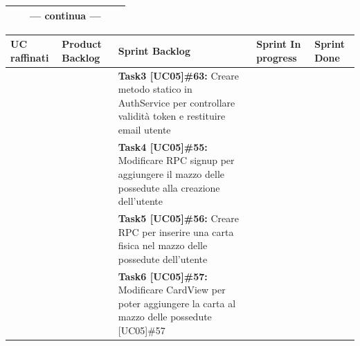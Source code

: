 \begin{landscape}
\begin{itemize}
\begin{tabular}{ | p{6cm} | p{3.2cm} | p{7.8cm} | p{3.6cm} | p{2.2cm}| }
                \hline
                & & --- continua --- & & \\
                \hline
            \end{tabular}
            \newpage

            \begin{tabular}{ | p{6cm} | p{3.2cm} | p{7.8cm} | p{3.6cm} | p{2.2cm}| }
                \hline
                \textbf{UC raffinati}
                & \textbf{Product Backlog}
                & \textbf{Sprint Backlog}
                & \textbf{Sprint In progress}
                & \textbf{Sprint Done} \\
                \hline
                \hline
                & & \textbf{Task3 [UC05]\#63:} Creare metodo statico in AuthService per controllare validità token e restituire email utente  & & \\
                \hline
                & & \textbf{Task4 [UC05]\#55:} Modificare RPC signup per aggiungere il mazzo delle possedute alla creazione dell'utente  & & \\
                \hline
                & & \textbf{Task5 [UC05]\#56:} Creare RPC per inserire una carta fisica nel mazzo delle possedute dell'utente  & & \\
                \hline
                & & \textbf{Task6 [UC05]\#57:} Modificare CardView per poter aggiungere la carta al mazzo delle possedute [UC05]\#57 & & \\
                \hline
            \end{tabular}
        \end{itemize}
        \newpage


\end{landscape}
